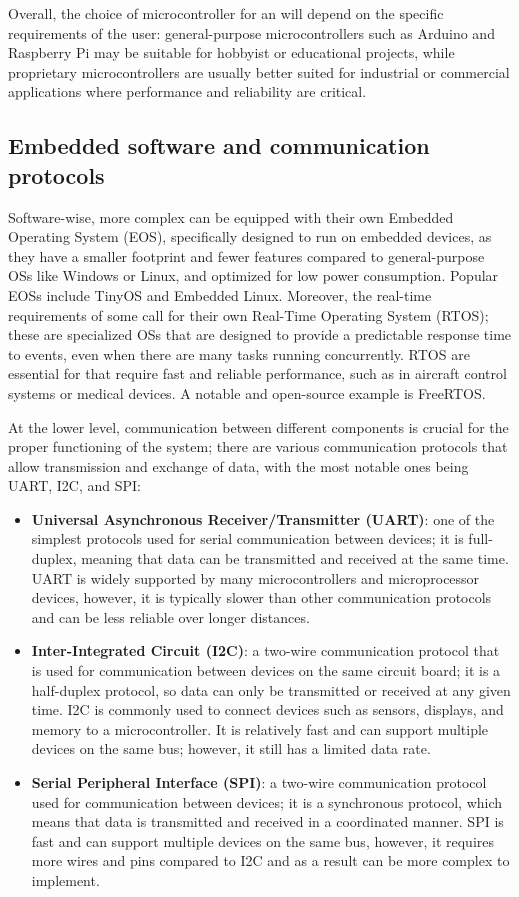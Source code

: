 Overall, the choice of microcontroller for an \es will depend on the specific requirements of the user: general-purpose microcontrollers such as Arduino and Raspberry Pi may be suitable for hobbyist or educational projects, while proprietary microcontrollers are usually better suited for industrial or commercial applications where performance and reliability are critical.


\subsection{Embedded software and communication protocols}
Software-wise, more complex \ess can be equipped with their own Embedded Operating System (EOS), specifically designed to run on embedded devices, as they have a smaller footprint and fewer features compared to general-purpose OSs like Windows or Linux, and optimized for low power consumption. Popular EOSs include TinyOS and Embedded Linux.
Moreover, the real-time requirements of some \ess call for their own Real-Time Operating System (RTOS); these are specialized OSs that are designed to provide a predictable response time to events, even when there are many tasks running concurrently. RTOS are essential for \es that require fast and reliable performance, such as in aircraft control systems or medical devices. A notable and open-source example is FreeRTOS. 

At the lower level, communication between different components is crucial for the proper functioning of the system; there are various communication protocols that allow transmission and exchange of data, with the most notable ones being UART, I2C, and SPI:
\begin{itemize}
    \item \textbf{Universal Asynchronous Receiver/Transmitter (UART)}: one of the simplest protocols used for serial communication between devices; it is full-duplex, meaning that data can be transmitted and received at the same time. UART is widely supported by many microcontrollers and microprocessor devices, however, it is typically slower than other communication protocols and can be less reliable over longer distances.
    \item \textbf{Inter-Integrated Circuit (I2C)}: a two-wire communication protocol that is used for communication between devices on the same circuit board; it is a half-duplex protocol, so data can only be transmitted or received at any given time. I2C is commonly used to connect devices such as sensors, displays, and memory to a microcontroller. It is relatively fast and can support multiple devices on the same bus; however, it still has a limited data rate.
    \item \textbf{Serial Peripheral Interface (SPI)}: a two-wire communication protocol used for communication between devices; it is a synchronous protocol, which means that data is transmitted and received in a coordinated manner. SPI is fast and can support multiple devices on the same bus, however, it requires more wires and pins compared to I2C and as a result can be more complex to implement.
\end{itemize} 


